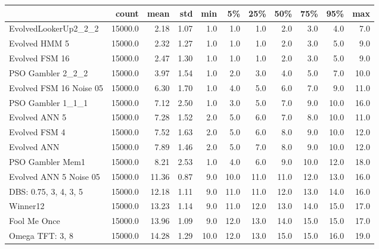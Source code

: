 \begin{tabular}{lrrrrrrrrrr}
\toprule
{} &    count &   mean &   std &   min &    5\% &   25\% &   50\% &   75\% &   95\% &   max \\
\midrule
EvolvedLookerUp2\_2\_2    &  15000.0 &   2.18 &  1.07 &   1.0 &   1.0 &   1.0 &   2.0 &   3.0 &   4.0 &   7.0 \\
Evolved HMM 5           &  15000.0 &   2.32 &  1.27 &   1.0 &   1.0 &   1.0 &   2.0 &   3.0 &   5.0 &   9.0 \\
Evolved FSM 16          &  15000.0 &   2.47 &  1.30 &   1.0 &   1.0 &   1.0 &   2.0 &   3.0 &   5.0 &   9.0 \\
PSO Gambler 2\_2\_2       &  15000.0 &   3.97 &  1.54 &   1.0 &   2.0 &   3.0 &   4.0 &   5.0 &   7.0 &  10.0 \\
Evolved FSM 16 Noise 05 &  15000.0 &   6.30 &  1.70 &   1.0 &   4.0 &   5.0 &   6.0 &   7.0 &   9.0 &  11.0 \\
PSO Gambler 1\_1\_1       &  15000.0 &   7.12 &  2.50 &   1.0 &   3.0 &   5.0 &   7.0 &   9.0 &  10.0 &  16.0 \\
Evolved ANN 5           &  15000.0 &   7.28 &  1.52 &   2.0 &   5.0 &   6.0 &   7.0 &   8.0 &  10.0 &  11.0 \\
Evolved FSM 4           &  15000.0 &   7.52 &  1.63 &   2.0 &   5.0 &   6.0 &   8.0 &   9.0 &  10.0 &  12.0 \\
Evolved ANN             &  15000.0 &   7.89 &  1.46 &   2.0 &   5.0 &   7.0 &   8.0 &   9.0 &  10.0 &  12.0 \\
PSO Gambler Mem1        &  15000.0 &   8.21 &  2.53 &   1.0 &   4.0 &   6.0 &   9.0 &  10.0 &  12.0 &  18.0 \\
Evolved ANN 5 Noise 05  &  15000.0 &  11.36 &  0.87 &   9.0 &  10.0 &  11.0 &  11.0 &  12.0 &  13.0 &  16.0 \\
DBS: 0.75, 3, 4, 3, 5   &  15000.0 &  12.18 &  1.11 &   9.0 &  11.0 &  11.0 &  12.0 &  13.0 &  14.0 &  16.0 \\
Winner12                &  15000.0 &  13.23 &  1.14 &   9.0 &  11.0 &  12.0 &  13.0 &  14.0 &  15.0 &  17.0 \\
Fool Me Once            &  15000.0 &  13.96 &  1.09 &   9.0 &  12.0 &  13.0 &  14.0 &  15.0 &  15.0 &  17.0 \\
Omega TFT: 3, 8         &  15000.0 &  14.28 &  1.29 &  10.0 &  12.0 &  13.0 &  15.0 &  15.0 &  16.0 &  19.0 \\
\bottomrule
\end{tabular}
